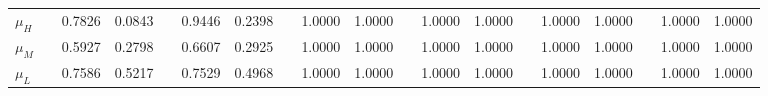 \begin{table}
{\begin{tabular}{lc@{\hs}rrc@{\s}rrc@{\s}rrc@{\s}rrc@{\s}rrc@{\s}rr}
$\mu_{H}$ & \phantom{a} & 0.7826 & 0.0843 & \phantom{a} & 0.9446 & 0.2398 & \phantom{a} & 1.0000 & 1.0000 & \phantom{a} & 1.0000 & 1.0000 & \phantom{a} & 1.0000 & 1.0000 & \phantom{a} & 1.0000 & 1.0000 \\
$\mu_{M}$ & \phantom{a} & 0.5927 & 0.2798 & \phantom{a} & 0.6607 & 0.2925 & \phantom{a} & 1.0000 & 1.0000 & \phantom{a} & 1.0000 & 1.0000 & \phantom{a} & 1.0000 & 1.0000 & \phantom{a} & 1.0000 & 1.0000 \\
$\mu_{L}$ & \phantom{a} & 0.7586 & 0.5217 & \phantom{a} & 0.7529 & 0.4968 & \phantom{a} & 1.0000 & 1.0000 & \phantom{a} & 1.0000 & 1.0000 & \phantom{a} & 1.0000 & 1.0000 & \phantom{a} & 1.0000 & 1.0000 \\


\end{tabular}}
\end{table}
